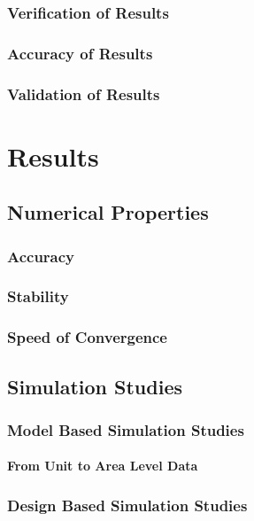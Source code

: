 \section{Verification of Results}
\section{Accuracy of Results}
\section{Validation of Results}



\part{Results}\label{part:results}

\chapter{Numerical Properties}
\section{Accuracy}
\section{Stability}
\section{Speed of Convergence}

\chapter{Simulation Studies}
\section{Model Based Simulation Studies}


\subsection{From Unit to Area Level Data}


\section{Design Based Simulation Studies}


